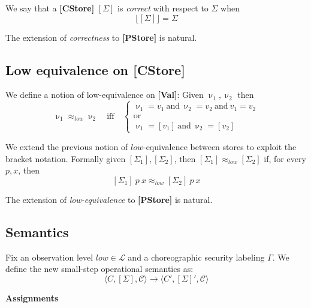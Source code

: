 \documentclass[12pt,a4paper,twoside]{book}
\newcommand{\MCL}{\mathscr{L}}
\begin{document}
We say that a \textbf{[CStore]} $[\Sigma]$ is \emph{correct} with respect to $\Sigma$ when
$$
\lfloor [\Sigma] \rfloor = \Sigma
$$

The extension of \emph{correctness} to \textbf{[PStore]} is natural.


\subsection{Low equivalence on \textbf{[CStore]}}
We define a notion of low-equivalence on \textbf{[Val]}: Given $\upnu_1, \upnu_2$ then
\begin{equation}
\upnu_1 \approx_{low} \upnu_2
\quad\text{iff}\quad
\begin{cases}
\upnu_1 = v_1~\text{and}~\upnu_2 = v_2~\text{and}~v_1 = v_2\\
\text{or}\\
\upnu_1 = [v_1]~\text{and}~\upnu_2 = [v_2]
\end{cases}
\end{equation}

We extend the previous notion of $low$-equivalence between stores to exploit the bracket notation. Formally given $[\Sigma_1], [\Sigma_2]$, then $[\Sigma_1] \approx_{low} [\Sigma_2]$ if, for every $p, x$, then
$$
[\Sigma_1]~p~x \approx_{low} [\Sigma_2]~p~x
$$

The extension of \emph{low-equivalence} to \textbf{[PStore]} is natural.


\subsection{Semantics}

Fix an observation level $low \in \MCL$ and a choreographic security labeling $\Gamma$. We define the new small-step operational semantics as:
\[
	\langle C,[\Sigma],\mathscr{C} \rangle \rightarrow \langle C',[\Sigma]',\mathscr{C} \rangle
\]

\noindent\textbf{Assignments}
\begin{mathpar}


\end{mathpar}
\end{document}
